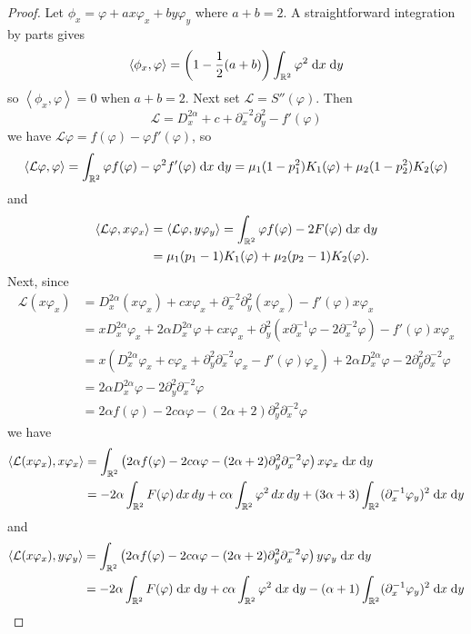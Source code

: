 \documentclass[10pt]{article}
\numberwithin{equation}{section}
\newcommand{\dd}{\;{\rm d}}
\newcommand{\ff}{\varphi}
\begin{document}
	\vskip 10pt
	\begin{proof} Let $\phi_x=\ff+ax\ff_x+by\ff_y$ where $a+b=2$. A straightforward integration by parts gives
		\[
		\left<\phi_x,\ff\right>=\left(1-\frac12(a+b)\right)\int_{\mathbb R^2}\ff^2\dd x\dd y
		\]
		so $\left<\phi_x,\ff\right>=0$ when $a+b=2$. Next set $\mathcal{L}=S''(\ff)$. Then
		\[
		\mathcal{L}=D_x^{2\alpha}+c+\partial_x^{-2}\partial_y^2-f'(\ff)
		\]
		we have $\mathcal{L}\ff=f(\ff)-\ff f'(\ff)$, so 
		\[
		\left<\mathcal{L}\ff,\ff\right>=\int_{\mathbb R^2}\ff f(\ff)-\ff^2 f'(\ff)\dd x\dd y=
		\mu_1(1-p_1^2)K_1(\ff)+\mu_2(1-p_2^2)K_2(\ff)
		\]
		and
		\begin{align*}
			\left<\mathcal{L}\ff,x\ff_x\right>&=\left<\mathcal{L}\ff,y\ff_y\right>
			=\int_{\mathbb R^2}\ff f(\ff)-2F(\ff)\dd x\dd y\\
			&=\mu_1(p_1-1)K_1(\ff)+\mu_2(p_2-1)K_2(\ff).
		\end{align*}
		Next, since
		\begin{align*}
			\mathcal{L}(x\ff_x)&=D_x^{2\alpha}(x\ff_x)+cx\ff_x+\partial_x^{-2}\partial_y^2(x\ff_x)-f'(\ff)x\ff_x\\
			&=xD_x^{2\alpha}\ff_x+2\alpha D_x^{2\alpha}\ff+cx\ff_x+\partial_y^2(x\partial_x^{-1}\ff-2\partial_x^{-2}\ff)-f'(\ff)x\ff_x\\
			&=x\left(D_x^{2\alpha}\ff_x+c\ff_x+\partial_y^2\partial_x^{-2}\ff_x-f'(\ff)\ff_x\right)+2\alpha D_x^{2\alpha}\ff
			-2\partial_y^2\partial_x^{-2}\ff\\
			&=2\alpha D_x^{2\alpha}\ff-2\partial_y^2\partial_x^{-2}\ff\\
			&=2\alpha f(\ff)-2c\alpha\ff-(2\alpha+2)\partial_y^2\partial_x^{-2}\ff
		\end{align*}
		we have
		\begin{align*}
			\left<\mathcal{L}(x\ff_x),x\ff_x\right>&=\int_{\mathbb R^2}\left(2\alpha f(\ff)-2c\alpha\ff-(2\alpha+2)\partial_y^2\partial_x^{-2}\ff\right)x\ff_x\dd x\dd y\\
			&=-2\alpha\int_{\mathbb R^2}F(\ff)\,dx\,dy+c\alpha\int_{\mathbb R^2}\ff^2\,dx\,dy+(3\alpha+3)\int_{\mathbb R^2}(\partial_x^{-1}\ff_y)^2\dd x\dd y
		\end{align*}
		and
		\begin{align*}
			\left<\mathcal{L}(x\ff_x),y\ff_y\right>&=\int_{\mathbb R^2}\left(2\alpha f(\ff)-2c\alpha\ff-(2\alpha+2)\partial_y^2\partial_x^{-2}\ff\right)y\ff_y\dd x\dd y\\
			&=-2\alpha\int_{\mathbb R^2}F(\ff)\dd x\dd y+c\alpha\int_{\mathbb R^2}\ff^2\dd x\dd y-(\alpha+1)\int_{\mathbb R^2}(\partial_x^{-1}\ff_y)^2\dd x\dd y

\end{align*}
\end{proof}
\end{document}
